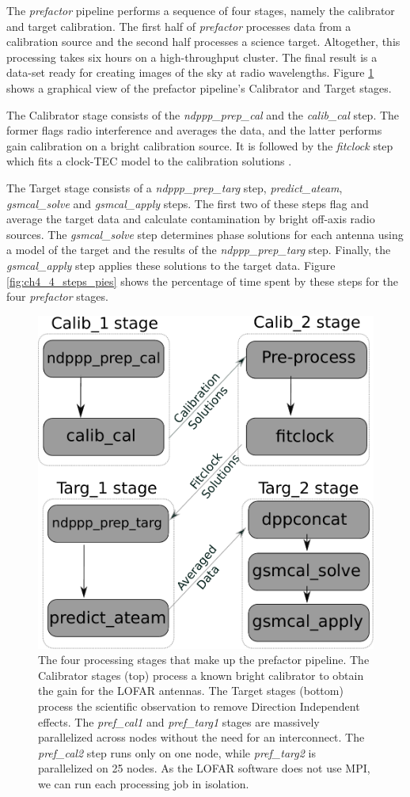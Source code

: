 The \textit{prefactor} pipeline performs a sequence of four stages, namely the calibrator and target calibration. The first half of \textit{prefactor} processes data from a calibration source and the second half processes a science target. Altogether, this processing takes six hours on a high-throughput cluster. The final result is a data-set ready for creating  images of the sky at radio wavelengths. Figure \ref{fig:ch4_four_steps_box} shows a graphical view of the prefactor pipeline's Calibrator and Target stages.


The Calibrator stage consists of the \textit{ndppp\_prep\_cal} and the \textit{calib\_cal} step. The former flags radio interference and averages the data, and the latter performs gain calibration on a bright calibration source. It is followed by the \textit{fitclock} step which fits a clock-TEC model to the calibration solutions \citep{vanweeren2016}.  

The Target stage consists of a \textit{ndppp\_prep\_targ} step, \textit{predict\_ateam}, \textit{gsmcal\_solve} and \textit{gsmcal\_apply} steps. The first two of these steps flag and average the target data and calculate contamination by bright off-axis radio sources. The \textit{gsmcal\_solve} step determines phase solutions for each antenna using a model of the target and the results of the \textit{ndppp\_prep\_targ} step. Finally, the \textit{gsmcal\_apply} step applies these solutions to the target data. Figure \ref{fig:ch4_4_steps_pies} shows the percentage of time spent by these steps for the four \textit{prefactor} stages.

\begin{figure}[H]
    \centering
    \includegraphics[width=0.5\linewidth]{ch4/figures/fig1/fig1.pdf}
      \caption[The four processing stages that make up the prefactor pipeline.]{The four processing stages that make up the prefactor pipeline. The Calibrator stages (top) process a known bright calibrator to obtain the gain for the LOFAR antennas. The Target stages (bottom) process the scientific observation to remove Direction Independent effects. The \textit{pref\_cal1} and \textit{pref\_targ1} stages are massively parallelized across nodes without the need for an interconnect. The \textit{pref\_cal2} step runs only on one node, while \textit{pref\_targ2} is parallelized on 25 nodes. As the LOFAR software does not use MPI, we can run each processing job in isolation. }
	\label{fig:ch4_four_steps_box}
\end{figure}

